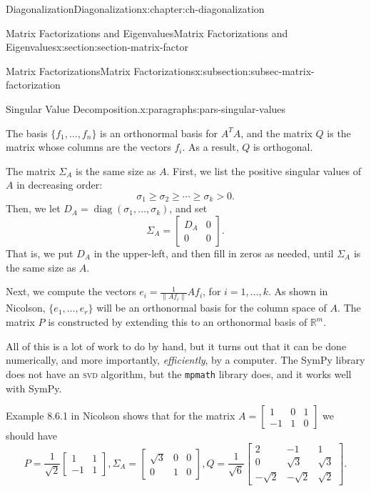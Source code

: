 \documentclass[oneside,10pt,]{book}
\newcommand{\mono}[1]{\texttt{#1}}
\newcommand{\initialism}[1]{\textsc{\MakeLowercase{#1}}}
\numberwithin{equation}{section}
\newcommand{\bbm}{\begin{bmatrix}}
\newcommand{\ebm}{\end{bmatrix}}
\newcommand{\R}{\mathbb{R}}
\newcommand{\len}[1]{\lVert #1\rVert}
\newcommand{\gt}{>}
\newcommand{\amp}{&}
\begin{document}
\begin{chapterptx}{Diagonalization}{}{Diagonalization}{}{}{x:chapter:ch-diagonalization}
\begin{sectionptx}{Matrix Factorizations and Eigenvalues}{}{Matrix Factorizations and Eigenvalues}{}{}{x:section:section-matrix-factor}
\begin{subsectionptx}{Matrix Factorizations}{}{Matrix Factorizations}{}{}{x:subsection:subsec-matrix-factorization}
\begin{paragraphs}{Singular Value Decomposition.}{x:paragraphs:pars-singular-values}
%
\par
The basis \(\{f_1,\ldots, f_n\}\) is an orthonormal basis for \(A^TA\), and the matrix \(Q\) is the matrix whose columns are the vectors \(f_i\). As a result, \(Q\) is orthogonal.%
\par
The matrix \(\Sigma_A\) is the same size as \(A\). First, we list the positive singular values of \(A\) in decreasing order:%
\begin{equation*}
\sigma_1\geq \sigma_2\geq \cdots \geq \sigma_k\gt 0\text{.}
\end{equation*}
Then, we let \(D_A = \operatorname{diag}(\sigma_1,\ldots, \sigma_k)\), and set%
\begin{equation*}
\Sigma_A = \begin{bmatrix}D_A\amp 0\\0\amp 0\end{bmatrix}\text{.}
\end{equation*}
That is, we put \(D_A\) in the upper-left, and then fill in zeros as needed, until \(\Sigma_A\) is the same size as \(A\).%
\par
Next, we compute the vectors \(e_i = \frac{1}{\len{Af_i}}Af_i\), for \(i=1,\ldots, k\). As shown in Nicolson, \(\{e_1,\ldots, e_r\}\) will be an orthonormal basis for the column space of \(A\). The matrix \(P\) is constructed by extending this to an orthonormal basis of \(\R^m\).%
\par
All of this is a lot of work to do by hand, but it turns out that it can be done numerically, and more importantly, \emph{efficiently}, by a computer. The SymPy library does not have an \initialism{SVD} algorithm, but the \mono{mpmath} library does, and it works well with SymPy.%
\par
Example 8.6.1 in Nicolson shows that for the matrix \(A = \begin{bmatrix}1\amp 0\amp 1\\-1\amp 1\amp 0\end{bmatrix}\) we should have%
\begin{equation*}
P = \frac{1}{\sqrt{2}}\bbm 1\amp 1\\-1\amp 1\ebm, \Sigma_A = \bbm \sqrt{3}\amp 0\amp 0\\0\amp 1\amp 0\ebm, Q = \frac{1}{\sqrt{6}}\bbm2\amp -1\amp 1\\0\amp \sqrt{3}\amp \sqrt{3}\\-\sqrt{2}\amp -\sqrt{2}\amp \sqrt{2}\ebm\text{.}

\end{equation*}
\end{paragraphs}
\end{subsectionptx}
\end{sectionptx}
\end{chapterptx}
\end{document}
